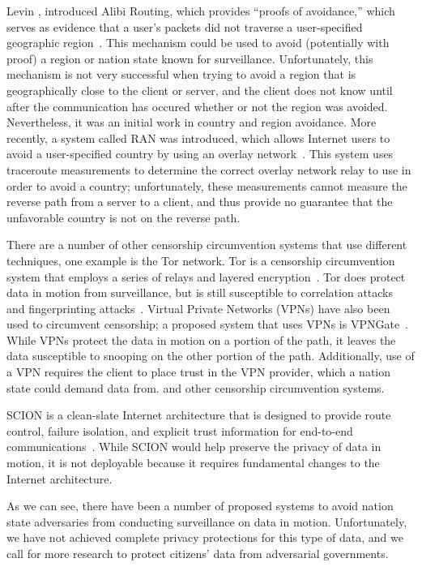 Levin \ea, introduced Alibi Routing, which provides ``proofs of avoidance,'' which serves as evidence that a user's packets did not traverse a user-specified geographic region~\cite{levin2015alibi}.  This mechanism could be used to avoid (potentially with proof) a region or nation state known for surveillance.  Unfortunately, this mechanism is not very successful when trying to avoid a region that is geographically close to the client or server, and the client does not know until after the communication has occured whether or not the region was avoided.  Nevertheless, it was an initial work in country and region avoidance.  More recently, a system called RAN was introduced, which allows Internet users to avoid a user-specified country by using an overlay network~\cite{edmundson2017ran}.  This system uses traceroute measurements to determine the correct overlay network relay to use in order to avoid a country; unfortunately, these measurements cannot measure the reverse path from a server to a client, and thus provide no guarantee that the unfavorable country is not on the reverse path.

There are a number of other censorship circumvention systems that use different techniques, one example is the Tor network.  Tor is a censorship circumvention system that employs a series of relays and layered encryption~\cite{dingledine2004tor}.  Tor does protect data in motion from surveillance, but is still susceptible to correlation attacks and fingerprinting attacks~\cite{sun2015raptor,shmatikov2006timing,feamster2004location,greschbach2016effect}.  Virtual Private Networks (VPNs) have also been used to circumvent censorship; a proposed system that uses VPNs is VPNGate~\cite{nobori2014vpn}.  While VPNs protect the data in motion on a portion of the path, it leaves the data susceptible to snooping on the other portion of the path.  Additionally, use of a VPN requires the client to place trust in the VPN provider, which a nation state could demand data from.  and other censorship circumvention systems.    

SCION is a clean-slate Internet architecture that is designed to provide route control, failure isolation, and explicit trust information for end-to-end communications~\cite{zhang2011scion}.  While SCION would help preserve the privacy of data in motion, it is not deployable because it requires fundamental changes to the Internet architecture.

As we can see, there have been a number of proposed systems to avoid nation state adversaries from conducting surveillance on data in motion.  Unfortunately, we have not achieved complete privacy protections for this type of data, and we call for more research to protect citizens' data from adversarial governments.  

